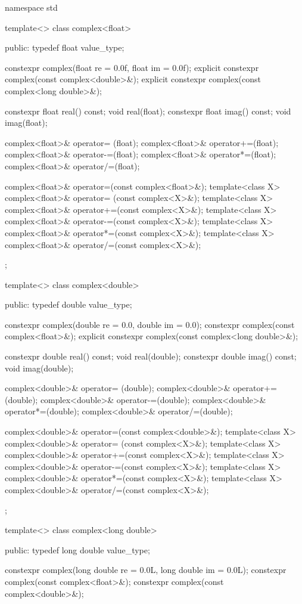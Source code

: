 \begin{codeblock}
namespace std {
  template<> class complex<float> {
  public:
    typedef float value_type;

    constexpr complex(float re = 0.0f, float im = 0.0f);
    explicit constexpr complex(const complex<double>&);
    explicit constexpr complex(const complex<long double>&);

    constexpr float real() const;
    void real(float);
    constexpr float imag() const;
    void imag(float);

    complex<float>& operator= (float);
    complex<float>& operator+=(float);
    complex<float>& operator-=(float);
    complex<float>& operator*=(float);
    complex<float>& operator/=(float);

    complex<float>& operator=(const complex<float>&);
    template<class X> complex<float>& operator= (const complex<X>&);
    template<class X> complex<float>& operator+=(const complex<X>&);
    template<class X> complex<float>& operator-=(const complex<X>&);
    template<class X> complex<float>& operator*=(const complex<X>&);
    template<class X> complex<float>& operator/=(const complex<X>&);
  };

  template<> class complex<double> {
  public:
    typedef double value_type;

    constexpr complex(double re = 0.0, double im = 0.0);
    constexpr complex(const complex<float>&);
    explicit constexpr complex(const complex<long double>&);

    constexpr double real() const;
    void real(double);
    constexpr double imag() const;
    void imag(double);

    complex<double>& operator= (double);
    complex<double>& operator+=(double);
    complex<double>& operator-=(double);
    complex<double>& operator*=(double);
    complex<double>& operator/=(double);

    complex<double>& operator=(const complex<double>&);
    template<class X> complex<double>& operator= (const complex<X>&);
    template<class X> complex<double>& operator+=(const complex<X>&);
    template<class X> complex<double>& operator-=(const complex<X>&);
    template<class X> complex<double>& operator*=(const complex<X>&);
    template<class X> complex<double>& operator/=(const complex<X>&);
  };

  template<> class complex<long double> {
  public:
    typedef long double value_type;

    constexpr complex(long double re = 0.0L, long double im = 0.0L);
    constexpr complex(const complex<float>&);
    constexpr complex(const complex<double>&);

}}
\end{codeblock}
